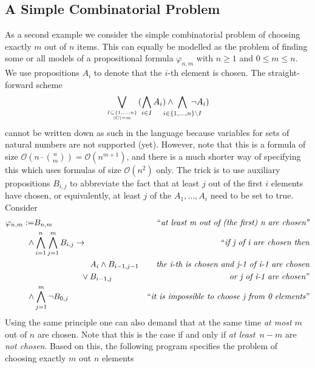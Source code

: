 \documentclass[twoside]{article}
\begin{document}
 
\subsection{A Simple Combinatorial Problem}

As a second example we consider the simple combinatorial problem of choosing exactly $m$ out of $n$ items. This can equally be modelled as the problem
of finding some or all models of a propositional formula $\varphi_{n,m}$ with $n \ge 1$ and $0 \le m \le n$. We use propositions $A_i$ to denote that
the $i$-th element is chosen. The straight-forward scheme
\begin{displaymath}
\bigvee\limits_{I \subseteq \{1,\ldots,n\} \atop |C| = m} (\bigwedge\limits_{i \in I} A_i) \wedge \hspace*{-5mm} \bigwedge\limits_{i \in \{1,\ldots,n\} \setminus I} \hspace*{-5mm} \neg A_i) 
\end{displaymath}
cannot be written down as such in the \DiMo language because variables for sets of natural numbers are not supported (yet). However, note that this 
is a formula of size $\mathcal{O}(n \cdot \binom{n}{m}) = \mathcal{O}(n^{m+1})$, and there is a much shorter way of specifying this which uses formulas
of size $\mathcal{O}(n^2)$ only. The trick is to use auxiliary propositions $B_{i,j}$ to abbreviate the fact that at least $j$ out of the first $i$
elements have chosen, or equivalently, at least $j$ of the $A_1,\ldots,A_i$ need to be set to true. Consider
\begin{align*}
\varphi_{n,m} := &B_{n,m}  & \text{``\emph{at least m out of (the first) n are chosen''}} \\ 
\wedge &\bigwedge\limits_{i=1}^n \bigwedge\limits_{j=1}^m B_{i,j} \to & \text{``\emph{if j of i are chosen then}} \\
&\hspace*{2.4cm} A_i \wedge B_{i-1,j-1} & \text{\emph{the i-th is chosen and j-1 of i-1 are chosen}} \\
&\hspace*{2cm}\vee B_{i-1,j} &\text{\emph{or j of i-1 are chosen}''} \\
\wedge &\bigwedge\limits_{j=1}^m \neg B_{0,j} & \text{``\emph{it is impossible to choose j from 0 elements}''}
\end{align*}
Using the same principle one can also demand that at the same time \emph{at most} $m$ out of $n$ are chosen. Note that this is the case if and only if
\emph{at least} $n-m$ are \emph{not chosen}. Based on this, the following \DiMo program specifies the problem of choosing exactly $m$ out $n$ elements
\end{document}
